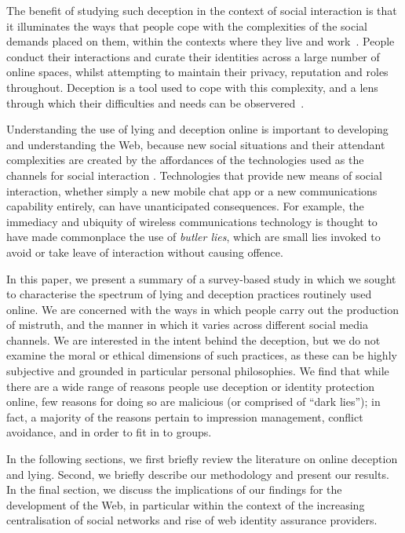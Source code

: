 \documentclass{sig-alternate}
\begin{document}
The benefit of studying such deception in the context of social interaction is that it illuminates the ways that people cope with the complexities of the social demands placed on them, within the contexts where they live and work~\cite{camden1984white}.  
People conduct their interactions and curate their identities across a large number of online spaces, whilst attempting to maintain their privacy, reputation and roles throughout. Deception is a tool used to cope with this complexity, and a lens through which their difficulties and needs can be observered~\cite{hancock2007digital, Burgoon:2003:TDM:820748.821362}.  

Understanding the use of lying and deception online is important to developing and understanding the Web, because new social situations and their attendant complexities are created by the affordances of the technologies used as the channels for social interaction \cite{hancock2004deception}.  Technologies that provide new means of social interaction, whether simply a new mobile chat app or a new communications capability entirely, can have unanticipated consequences.   For example, the immediacy and ubiquity of wireless communications technology is thought to have made commonplace the use of \emph{butler lies}, which are small lies invoked to avoid or take leave of interaction \cite{hancock2009butler} without causing offence.  

In this paper, we present a summary of a survey-based study in which we sought to characterise the spectrum of lying and deception practices routinely used online. We are concerned with the ways in which people carry out the production of mistruth, and the manner in which it varies across different social media channels.
We are interested in the intent behind the deception, but we do not examine the moral or ethical dimensions of such practices, as these can be highly subjective and grounded in particular personal philosophies.
We find that while there are a wide range of reasons people use deception or identity protection online, few reasons for doing so are malicious (or comprised of ``dark lies''); in fact, a majority of the reasons pertain to impression management, conflict avoidance, and in order to fit in to groups.

In the following sections, we first briefly review the literature on online deception and lying. Second, we briefly describe our methodology and present our results. In the final section, we discuss the implications of our findings 
for the development of the Web,
in particular within the context of the increasing centralisation of social networks and rise of web identity assurance providers.
\end{document}
